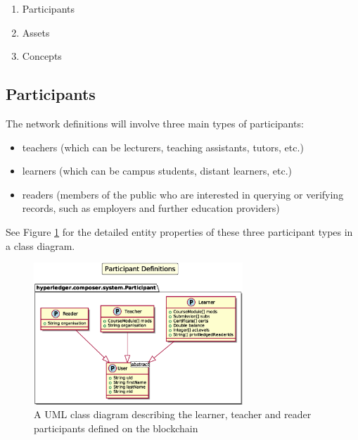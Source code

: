 \begin{enumerate}
    \setlength\itemsep{0em}    
    \item Participants
    \item Assets
    \item Concepts
\end{enumerate}



\subsection{Participants}

The network definitions will involve three main types of participants: 
\begin{itemize}
    \setlength\itemsep{0em}    
    \item teachers (which can be lecturers, teaching assistants, tutors, etc.)
    \item learners (which can be campus students, distant learners, etc.)
    \item readers (members of the public who are interested in querying or verifying records, 
    such as employers and further education providers)
\end{itemize}

See Figure \ref{fig:participants} for the detailed entity properties of these three participant types 
in a class diagram.

\begin{figure}[!ht] 
    \centering    
    \includegraphics[width=0.7\textwidth]{participants}
    \caption[Participants Class Diagram]
        {A UML class diagram describing the learner, teacher and reader participants defined on the blockchain} 
    \label{fig:participants}
\end{figure}


